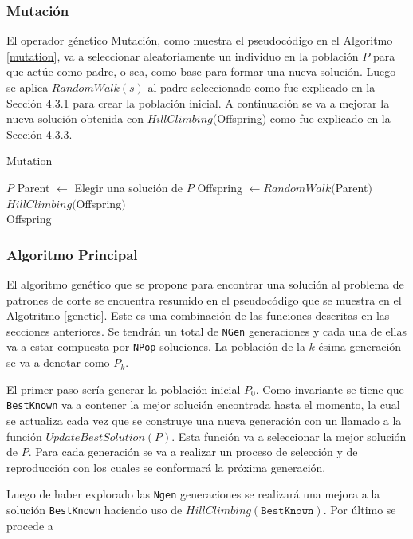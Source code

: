 \documentclass[a4paper,10pt,twocolumn]{article}
\begin{document}
\subsubsection{Mutación}

El operador génetico Mutación, como muestra el pseudocódigo en el Algoritmo 	\ref{mutation}, va a seleccionar aleatoriamente un individuo en la población $P$ para que actúe como padre, o sea, como base para formar una nueva solución. Luego se aplica $RandomWalk(s)$ al padre seleccionado como fue explicado en la Sección 4.3.1 para crear la población inicial. A continuación se va a mejorar la nueva solución obtenida con $HillClimbing$(Offspring) como fue explicado en la Sección 4.3.3.  


\algrenewcommand{}
\begin{algorithm}
	\caption{Mutation}\label{mutation}
	\begin{algorithmic}[1]
		\Require $P$
		\State Parent $\gets $ Elegir una solución de $P$
		\State Offspring $\gets RandomWalk($Parent$)$
		\State $ HillClimbing($Offspring$)$\\
		\Return Offspring 
	\end{algorithmic}
\end{algorithm}


\subsubsection{Algoritmo Principal}
El algoritmo genético que se propone para encontrar una solución al problema de patrones de corte se encuentra resumido en el pseudocódigo que se muestra en el Algotritmo \ref{genetic}. Este es una combinación de las funciones descritas en las secciones anteriores. Se tendrán un total de \texttt{NGen} generaciones y cada una de ellas va a estar compuesta por \texttt{NPop} soluciones. La población de la $k$-ésima generación se va a denotar como $P_k$.

El primer paso sería generar la población inicial $P_0$. Como invariante se tiene que \texttt{BestKnown} va a contener la mejor solución encontrada hasta el momento, la cual se actualiza cada vez que se construye una nueva generación con un llamado a la función $UpdateBestSolution(P)$. Esta función va a seleccionar la mejor solución de $P$. Para cada generación se va a realizar un proceso de selección y de reproducción con los cuales se conformará la próxima generación.

Luego de haber explorado las \texttt{Ngen} generaciones se realizará una mejora a la solución \texttt{BestKnown} haciendo uso de $HillClimbing(\mathtt{BestKnown})$. Por último se procede a 
 
\end{document}

